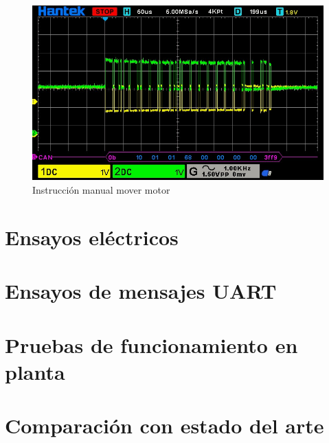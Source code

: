 \begin{figure}[htbp]
	\centering
	\includegraphics[scale=0.6]{./Figures/Motor_Manual_Move_CCW_360DEG.jpg}
	\caption{Instrucción manual mover motor}
	\label{fig:mot_move}
\end{figure}

\section{Ensayos eléctricos}

\section{Ensayos de mensajes UART}

\section{Pruebas de funcionamiento en planta}

\section{Comparación con estado del arte}
